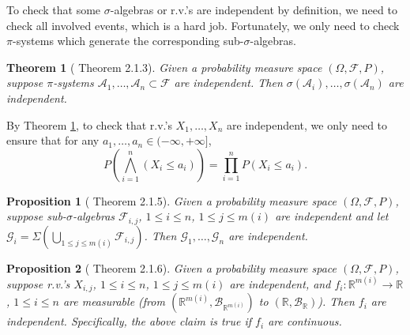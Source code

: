 \documentclass[openany]{book}
\newtheorem{proposition}{Proposition}[chapter]
\newtheorem{theorem}{Theorem}[chapter]
\theoremstyle{definition}
\theoremstyle{remark}
\begin{document}
To check that some $\sigma$-algebras or r.v.'s are independent by definition, we need to check all involved events, which is a hard job. Fortunately, we only need to check $\pi$-systems which generate the corresponding sub-$\sigma$-algebras.
\begin{theorem}[\cite{D10} Theorem 2.1.3]\label{thm:indepPiSystems}
    Given a probability measure space $(\Omega,\mathcal{F},P)$, suppose $\pi$-systems $\mathcal{A}_1,\ldots,\mathcal{A}_n\subset \mathcal{F}$ are independent. Then $\sigma(\mathcal{A}_i),\ldots,\sigma(\mathcal{A}_n)$ are independent.
\end{theorem}
By Theorem \ref{thm:indepPiSystems}, to check that r.v.'s $X_1,\ldots,X_n$ are independent, we only need to ensure that for any $a_1,\ldots,a_n\in(-\infty,+\infty]$,
\begin{equation*}
    P\left(\bigwedge_{i=1}^n(X_i\le a_i)\right)=\prod_{i=1}^n P(X_i\le a_i).
\end{equation*}
\begin{proposition}[\cite{D10} Theorem 2.1.5]
    Given a probability measure space $(\Omega,\mathcal{F},P)$, suppose sub-$\sigma$-algebras $\mathcal{F}_{i,j}$, $1\le i\le n$, $1\le j\le m(i)$ are independent and let $\mathcal{G}_i=\Sigma\left(\bigcup_{1\le j\le m(i)} \mathcal{F}_{i,j}\right)$. Then $\mathcal{G}_1,\ldots,\mathcal{G}_n$ are independent.
\end{proposition}
\begin{proposition}[\cite{D10} Theorem 2.1.6]
    Given a probability measure space $(\Omega,\mathcal{F},P)$, suppose r.v.'s $X_{i,j}$, $1\le i\le n$, $1\le j\le m(i)$ are independent, and $f_i:\mathbb{R}^{m(i)}\to \mathbb{R}$, $1\le i\le n$ are measurable (from $(\mathbb{R}^{m(i)},\mathcal{B}_{\mathbb{R}^{m(i)}})$ to $(\mathbb{R},\mathcal{B}_{\mathbb{R}})$). Then $f_i$ are independent. Specifically, the above claim is true if $f_i$ are continuous.
\end{proposition}
\end{document}
